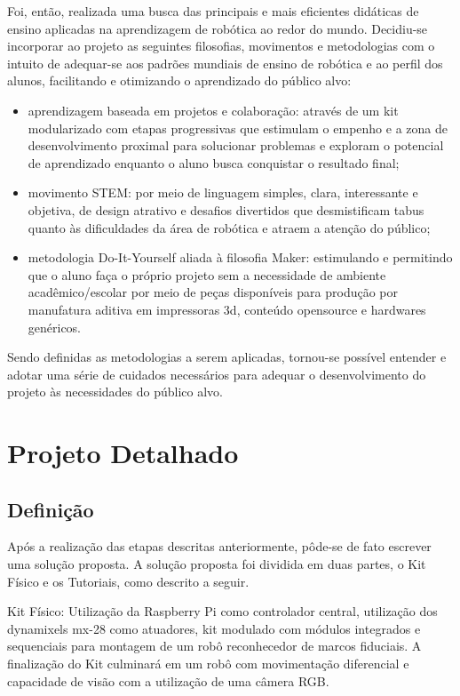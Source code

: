 Foi, então, realizada uma busca das principais e mais eficientes didáticas de ensino aplicadas na aprendizagem de robótica ao redor do mundo. Decidiu-se incorporar ao projeto as seguintes filosofias, movimentos e metodologias com o intuito de adequar-se aos padrões mundiais de ensino de robótica e ao perfil dos alunos, facilitando e otimizando o aprendizado do público alvo:
\begin{itemize}
	\item aprendizagem baseada em projetos e colaboração: através de um kit modularizado com etapas progressivas que estimulam o empenho e a zona de desenvolvimento proximal para solucionar problemas e exploram o potencial de aprendizado enquanto o aluno busca conquistar o resultado final;
	\item movimento STEM: por meio de linguagem simples, clara, interessante e objetiva, de design atrativo e desafios divertidos que desmistificam tabus quanto às dificuldades da área de robótica e atraem a atenção do público;
	\item metodologia Do-It-Yourself aliada à filosofia Maker: estimulando e permitindo que o aluno faça o próprio projeto sem a necessidade de ambiente acadêmico/escolar por meio de peças disponíveis para produção por manufatura aditiva em impressoras 3d, conteúdo opensource e hardwares genéricos.
\end{itemize}

Sendo definidas as metodologias a serem aplicadas, tornou-se possível entender e adotar uma série de cuidados necessários para adequar o desenvolvimento do projeto às necessidades do público alvo.

\section{Projeto Detalhado}
\subsection{Definição}
Após a realização das etapas descritas anteriormente, pôde-se de fato escrever uma solução proposta. A solução proposta foi dividida em duas partes, o Kit Físico e os Tutoriais, como descrito a seguir.

Kit Físico: Utilização da Raspberry Pi como controlador central, utilização dos dynamixels mx-28 como atuadores, kit modulado com módulos integrados e sequenciais para montagem de um robô reconhecedor de marcos fiduciais. A finalização do Kit culminará em um robô com movimentação diferencial e capacidade de visão com a utilização de uma câmera RGB.

